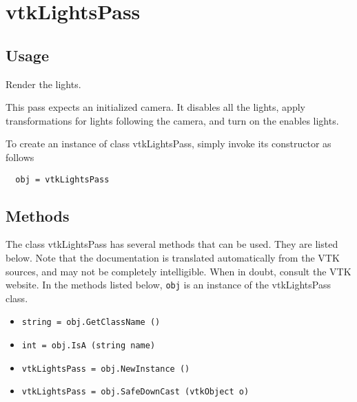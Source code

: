 \section{vtkLightsPass}

\subsection{Usage}

 Render the lights.

 This pass expects an initialized camera.
 It disables all the lights, apply transformations for lights following the
 camera, and turn on the enables lights.
 

To create an instance of class vtkLightsPass, simply
invoke its constructor as follows
\begin{verbatim}
  obj = vtkLightsPass
\end{verbatim}
\subsection{Methods}

The class vtkLightsPass has several methods that can be used.
  They are listed below.
Note that the documentation is translated automatically from the VTK sources,
and may not be completely intelligible.  When in doubt, consult the VTK website.
In the methods listed below, \verb|obj| is an instance of the vtkLightsPass class.
\begin{itemize}
\item  \verb|string = obj.GetClassName ()|

\item  \verb|int = obj.IsA (string name)|

\item  \verb|vtkLightsPass = obj.NewInstance ()|

\item  \verb|vtkLightsPass = obj.SafeDownCast (vtkObject o)|

\end{itemize}
